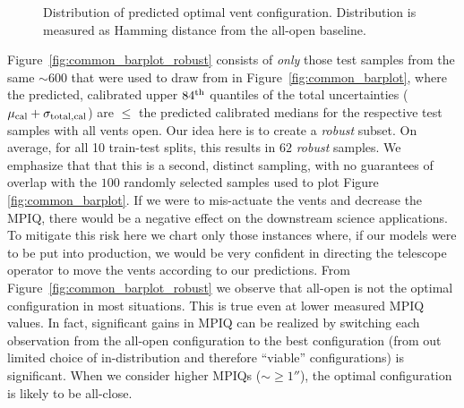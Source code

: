 \begin{figure*}
\caption{Distribution of predicted optimal vent configuration.  Distribution is measured as Hamming distance from the all-open baseline.}%
\label{fig:common_moneyplot2}
\end{figure*}

Figure~\ref{fig:common_barplot_robust} consists of \textit{only} those test samples from the same $\sim600$ that were used to draw from in Figure~\ref{fig:common_barplot}, where the predicted, calibrated upper $84^{\rm th}$ quantiles of the total uncertainties ($\mu_{\rm cal} + \sigma_{\rm total, cal}$) are $\leq$ the predicted calibrated medians for the respective test samples with all vents open. Our idea here is to create a {\it robust} subset. On average, for all 10 train-test splits, this results in $62$ \textit{robust} samples. We emphasize that that this is a second, distinct sampling, with no guarantees of overlap with the $100$ randomly selected samples used to plot Figure \ref{fig:common_barplot}. If we were to mis-actuate the vents and decrease the MPIQ, there would be a negative effect on the downstream science applications.  To mitigate this risk here we chart only those instances where, if our models were to be put into production, we would be very confident in directing the telescope operator to move the vents according to our predictions. From Figure~\ref{fig:common_barplot_robust} we observe that all-open is not the optimal configuration in most situations.  This is true even at lower measured MPIQ values. In fact, significant gains in MPIQ can be realized  by switching each observation from the all-open configuration to the best configuration (from out limited choice of in-distribution and therefore ``viable'' configurations) is significant. When we consider higher MPIQs ($\sim \geq 1''$), the optimal configuration is likely to be all-close. 

